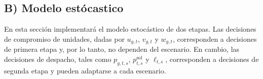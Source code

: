 \documentclass[
	spanish, %
	letterpaper, oneside
]{article}
\begin{document}

\subsection*{B) Modelo estócastico}
En esta sección implementará el modelo estocástico de dos etapas. Las decisiones de compromiso de unidades, dadas por $u_{g,t}$, $v_{g,t}$ y $w_{g,t}$, corresponden a decisiones de primera etapa y, por lo tanto, no dependen del escenario. En cambio, las decisiones de despacho, tales como $p_{g,t,s}$, $p^{\text{sol}}_{t,s}$ y $\ell_{t,s}$, corresponden a decisiones de segunda etapa y pueden adaptarse a cada escenario. %


\end{document}
